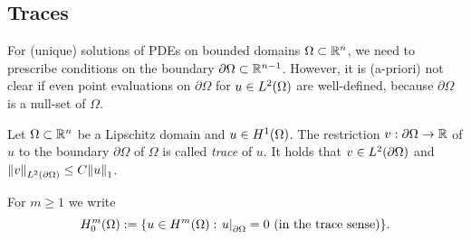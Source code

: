 \subsection{Traces}

For (unique) solutions of PDEs on bounded domains \(\Omega \subset \mathbb{R}^n\), we need to prescribe conditions on the boundary \(\partial\Omega \subset \mathbb{R}^{n - 1}\).
However, it is (a-priori) not clear if even point evaluations on \(\partial\Omega\) for \(u \in L^2\parentheses*{\Omega}\) are well-defined, because \(\partial\Omega\) is a null-set of \(\Omega\).

\begin{theorem}
	Let \(\Omega \subset \mathbb{R}^n\) be a Lipschitz domain and \(u \in H^1\parentheses*{\Omega}\).
	The restriction \(v: \partial\Omega \to \mathbb{R}\) of \(u\) to the boundary \(\partial\Omega\) of \(\Omega\) is called \emph{trace} of \(u\).
	It holds that \(v \in L^2\parentheses*{\partial\Omega}\) and \(\norm*{v}_{L^2\parentheses*{\partial\Omega}} \le C\norm*{u}_1\).
\end{theorem}

\begin{definition}
	For \(m \ge 1\) we write
	\[
		H_0^m\parentheses*{\Omega} := \braces*{u \in H^m\parentheses*{\Omega} : \left.u\right|_{\partial\Omega} = 0\text{ (in the trace sense)}}.
	\]
\end{definition}
